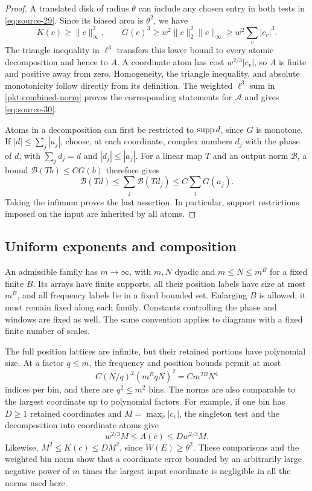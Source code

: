 \begin{proof}
A translated disk of radius $\theta$ can include any chosen entry in
both tests in \eqref{eq:source-29}.  Since its biased area is
$\theta^2$, we have
\[
 K(c)\ge\|c\|_\infty^2,
 \qquad
 G(c)^3\ge w^2\|c\|_2^2\|c\|_\infty
          \ge w^2\sum_v|c_v|^3.
\]
The triangle inequality in $\ell^3$ transfers this lower bound to
every atomic decomposition and hence to $A$.  A coordinate atom has
cost $w^{2/3}|c_v|$, so $A$ is finite and positive away from zero.
Homogeneity, the triangle inequality, and absolute monotonicity follow
directly from its definition.  The weighted $\ell^3$ sum in
\eqref{pkt:combined-norm} proves the corresponding statements for
$\mathcal A$ and gives \eqref{eq:source-30}.

Atoms in a decomposition can first be restricted to $\operatorname{supp} d$, since
$G$ is monotone.  If $|d|\le\sum_j|a_j|$, choose, at each coordinate,
complex numbers $d_j$ with the phase of $d$, with
$\sum_jd_j=d$ and $|d_j|\le|a_j|$.  For a linear map $T$ and an output
norm $\mathcal B$, a bound $\mathcal B(Tb)\le C G(b)$ therefore gives
\[
 \mathcal B(Td)\le\sum_j\mathcal B(Td_j)
       \le C\sum_jG(a_j).
\]
Taking the infimum proves the last assertion.  In particular, support
restrictions imposed on the input are inherited by all atoms.
\end{proof}

\subsection{Uniform exponents and composition}

\begin{definition}\label{pkt:families}
An admissible family has $m\to\infty$, with $m,N$ dyadic and
$m\le N\le m^B$ for a fixed finite $B$.  Its arrays have finite
supports, all their position labels have size at most $m^B$, and all
frequency labels lie in a fixed bounded set.  Enlarging $B$ is allowed;
it must remain fixed along each family.  Constants controlling the
phase and windows are fixed as well.  The same convention applies to
diagrams with a fixed finite number of scales.
\end{definition}

The full position lattices are infinite, but their retained portions
have polynomial size.  At a factor $q\le m$, the frequency and position
bounds permit at most
\[
 C(N/q)^2(m^BqN)^2=Cm^{2B}N^4
\]
indices per bin, and there are $q^2\le m^2$ bins.  The norms are also
comparable to the largest coordinate up to polynomial factors.  For
example, if one bin has $D\ge1$ retained coordinates and
$M=\max_v|c_v|$, the singleton test and the decomposition into coordinate
atoms give
\[
 w^{2/3}M\le A(c)\le D w^{2/3}M.
\]
Likewise, $M^2\le K(c)\le D M^2$, since $W(E)\ge\theta^2$.
These comparisons and the weighted bin norm show that a coordinate
error bounded by an arbitrarily large negative power of $m$ times the
largest input coordinate is negligible in all the norms used here.

